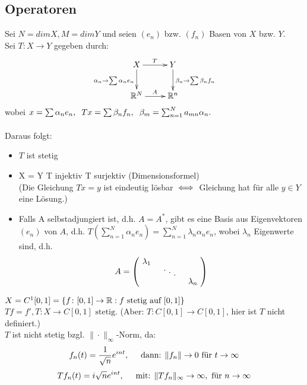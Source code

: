 \subsection*{Operatoren}


Sei $N = dim X, M = dim Y$ und seien $(e_n)$ bzw. $(f_n)$ Basen von $X$ bzw. $Y$. 	\\
Sei $T \colon X \rightarrow Y$ gegeben durch: \\
\[ \begin{xy} \xymatrix{
	X \ar[r]^T	\ar[d]_{ \alpha_{n} \rightarrow \sum \alpha_{n} e_{n} }  &   Y \ar[d]^{ \beta_{n} \rightarrow \sum \beta_{n} f_{n} }  \\
      	\MdR^{N} 	\ar[r]^A    				&   \MdR^{n}  				
} \end{xy} \]
wobei $x = \sum \alpha_{n} e_{n},\hspace{0.2cm} Tx = \sum \beta_n f_n, \hspace{0.2cm} \beta_m = \sum_{n = 1}^{N} a_{mn} \alpha_{n}. $ \\ \\
Daraus folgt:
\begin{itemize}
	\item $T$ ist stetig
	\item X = Y \gdw T injektiv \gdw T surjektiv (Dimensionsformel) \\
	(Die Gleichung $Tx = y$ ist eindeutig lösbar $\iff$ Gleichung hat für alle $y \in Y$ eine Lösung.)
	\item Falls A selbstadjungiert ist, d.h. $A = A^{*}$, gibt es eine Basis aus Eigenvektoren $(e_{n})$ von $A$, d.h. $ T( \sum_{n=1}^{N} \alpha_{n} e_{n} ) = \sum_{n=1}^{N} \lambda_{n} \alpha_{n} e_{n}$, wobei $\lambda_{n}$ Eigenwerte sind, d.h. 
		\[ A =
			\begin{pmatrix}
				\diagentry{\lambda_{1}}\\
				&\diagentry{\xddots}\\
				&&\diagentry{\lambda_{n}}\\
			\end{pmatrix} \]
\end{itemize}


\begin{beispiel}
$X = C^{1}[0, 1] = \{ f \colon [0, 1] \rightarrow \mathbb{R}: f \text{ stetig auf } [0, 1] \}$ \\
$T f = f', T \colon X \rightarrow C[0, 1] \text{ stetig.} $ (Aber: $T: C[0, 1] \rightarrow C[0, 1]$, hier ist $T$ nicht definiert.) \\

$T$ ist nicht stetig bzgl. $\| \cdot \|_{\infty}$-Norm, da:
\[ f_{n}(t) = \frac{1}{\sqrt{n}}e^{int}, \hspace{0.5cm}  \text{dann: } \|f_{n}\| \rightarrow 0 \text{ für } t \rightarrow \infty \]	
\[ T f_{n}(t) = i \sqrt{n} e^{int}, \hspace{0.5cm} \text{mit: } \| T f_{n} \|_{\infty} \rightarrow \infty, \text{ für } n \rightarrow \infty \]
\end{beispiel}


